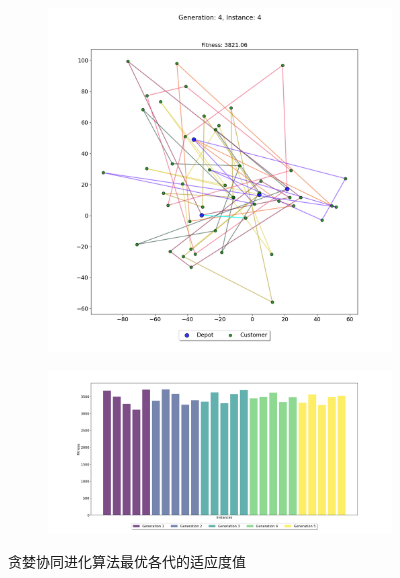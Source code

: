 \documentclass[12pt,a4paper,oneside]{ctexart}
\begin{document}
\vspace{-12pt} %

\begin{figure}[htbp]
	\centering
	\begin{subfigure}[b]{0.316\textwidth}
		\centering
		\includegraphics[width=\textwidth]{fig/13.png}
	\end{subfigure}
	\hspace{2pt} %
	\begin{subfigure}[b]{0.4\textwidth}
		\centering
		\includegraphics[width=\textwidth]{fig/14.png}
	\end{subfigure}
	\caption{贪婪协同进化算法最优各代的适应度值}
\end{figure}
\end{document}
